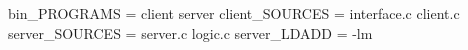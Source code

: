 bin\+\_\+\+P\+R\+O\+G\+R\+A\+MS = client server client\+\_\+\+S\+O\+U\+R\+C\+ES = interface.\+c client.\+c server\+\_\+\+S\+O\+U\+R\+C\+ES = server.\+c logic.\+c server\+\_\+\+L\+D\+A\+DD = -\/lm 